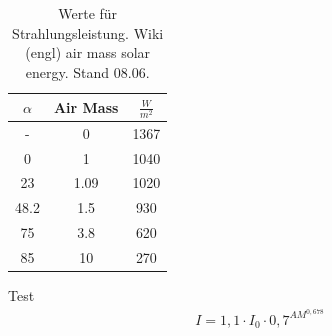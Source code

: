 \documentclass[fontsize=10pt,paper=a4,bibliography=totoc]{scrartcl}
\begin{document}
\begin{table}
\centering
	\caption{Werte für Strahlungsleistung. Wiki (engl) air mass solar energy. Stand 08.06.}
	\label{tab:airmass}
\begin{tabular}{|c|c|c|}
	\hline
	$\alpha$ & Air Mass & $\frac{W}{m^2}$\\
	\hline
	- & 0 & 1367\\
	\hline
	0 & 1 & 1040\\
	\hline
	23 & 1.09 & 1020\\
	\hline
	48.2 & 1.5 & 930\\
	\hline
	75 & 3.8 & 620\\
	\hline
	85 & 10 & 270\\
	\hline
\end{tabular}
\end{table}
Test
\begin{align*}
	I=1,1\cdot I_0 \cdot 0,7^{AM^{0,678}}
	\label{eqn:Intensity}
\end{align*}
\end{document}
